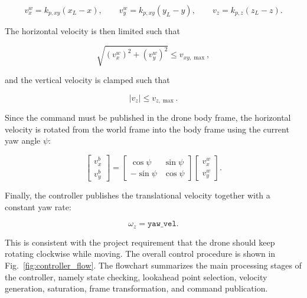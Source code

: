 \documentclass[12pt,twoside,letterpaper]{article}
\begin{document}
\begin{equation}
v_x^{w} = k_{p,xy}(x_L - x), \qquad
v_y^{w} = k_{p,xy}(y_L - y), \qquad
v_z = k_{p,z}(z_L - z).
\end{equation}

The horizontal velocity is then limited such that

\begin{equation}
\sqrt{(v_x^{w})^2 + (v_y^{w})^2} \leq v_{xy,\max},
\end{equation}

and the vertical velocity is clamped such that

\begin{equation}
|v_z| \leq v_{z,\max}.
\end{equation}

Since the command must be published in the drone body frame, the horizontal velocity is rotated from the world frame into the body frame using the current yaw angle $\psi$:

\begin{equation}
\begin{bmatrix}
v_x^{b}\\
v_y^{b}
\end{bmatrix}
=
\begin{bmatrix}
\cos\psi & \sin\psi\\
-\sin\psi & \cos\psi
\end{bmatrix}
\begin{bmatrix}
v_x^{w}\\
v_y^{w}
\end{bmatrix}.
\end{equation}

Finally, the controller publishes the translational velocity together with a constant yaw rate:

\begin{equation}
\omega_z = \texttt{yaw\_vel}.
\end{equation}

This is consistent with the project requirement that the drone should keep rotating clockwise while moving. The overall control procedure is shown in Fig.~\ref{fig:controller_flow}. The flowchart summarizes the main processing stages of the controller, namely state checking, lookahead point selection, velocity generation, saturation, frame transformation, and command publication.
\end{document}
